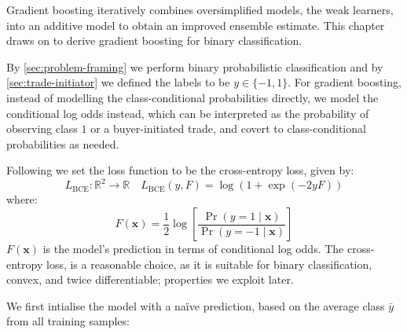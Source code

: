 Gradient boosting iteratively combines oversimplified models, the weak learners, into an additive model to obtain an improved ensemble estimate. This chapter draws on \textcite[][9]{friedmanGreedyFunctionApproximation2001} to derive gradient boosting for binary classification.

By \cref{sec:problem-framing} we perform binary probabilistic classification and by \cref{sec:trade-initiator} we defined the labels to be $y \in \{-1,1\}$. For gradient boosting, instead of modelling the class-conditional probabilities directly, we model the conditional log odds instead, which can be interpreted as the probability of observing class $1$ or a buyer-initiated trade, and covert to class-conditional probabilities as needed.


Following \textcite[][9]{friedmanStochasticGradientBoosting2002} we set the loss function to be the cross-entropy loss, given by:
\begin{equation}
    L_{\mathrm{BCE}} \colon \mathbb{R}^2 \to \mathbb{R} \quad L_{\mathrm{BCE}}(y, F) = \log(1+\exp(-2yF))
    \label{eq:cross-entropy-loss}
\end{equation}
where:
\begin{equation}
    F(\mathbf{x}) = \frac{1}{2} \log \left[\frac{\Pr(y=1\mid \mathbf{x})}{\Pr(y=-1\mid \mathbf{x})}\right]
    \label{eq:logits-gbm}
\end{equation}
$F(\mathbf{x})$ is the model's prediction in terms of conditional log odds. The cross-entropy loss, is a reasonable choice, as it is suitable for binary classification, convex, and twice differentiable; properties we exploit later.

We first intialise the model with a naïve prediction, based on the average class $\bar{y}$ from all training samples:


